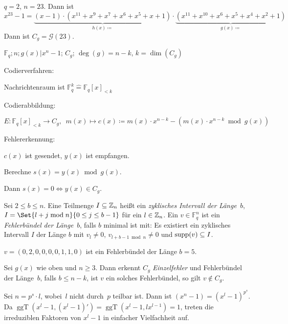 \documentclass{cheat-sheet}
\newcommand{\F}{\mathbb{F}} %
\newcommand{\divides}{|} %
\newcommand{\Golay}{\mathcal{G}} %
\DeclareMathOperator{\ggT}{ggT} %
\begin{document}
\begin{bsp}
  $q = 2$, $n = 23$.
  Dann ist
  \[
    x^{23} - 1 = \underbrace{(x-1) \cdot (x^{11} + x^9 + x^7 + x^6 + x^5 + x + 1)}_{h(x) \coloneqq} \cdot \underbrace{(x^{11} + x^{10} + x^6 + x^5 + x^4 + x^2 + 1)}_{g(x) \coloneqq}
  \]
  Dann ist $C_g = \Golay(23)$.
\end{bsp}


$\F_q; n; g(x) \divides x^n - 1$; $C_g$; $\deg(g) = n - k$, $k = \dim(C_g)$

Codierverfahren:

Nachrichtenraum ist $\F_q^k \hat{=} \F_q[x]_{< k}$

Codierabbildung:

\[
  E : \F_q[x]_{< k} \to C_g, \enspace m(x) \mapsto c(x) \coloneqq m(x) \cdot x^{n-k} - (m(x) \cdot x^{n-k} \bmod g(x))
\]

Fehlererkennung:

$c(x)$ ist gesendet, $y(x)$ ist empfangen.

Berechne $s(x) = y(x) \bmod g(x)$.

Dann $s(x) = 0 \iff y(x) \in C_g$.

\begin{defn}
  Sei $2 \leq b \leq n$.
  Eine Teilmenge $I \subseteq \mathbb{Z}_n$ heißt ein \emph{zyklisches Intervall der Länge~$b$}, \dh{} $I= \Set{l + j \bmod n}{0 \leq j \leq b-1}$ für ein $l \in \mathbb{Z}_n$.
  Ein $v \in \F_q^n$ ist ein \emph{Fehlerbündel der Länge~$b$}, falls $b$ minimal ist mit:
  Es existiert ein zyklisches Intervall $I$ der Länge $b$ mit $v_l \neq 0$, $v_{l+b-1 \bmod n} \neq 0$ und $\operatorname{supp}(v) \subseteq I$.
\end{defn}

\begin{bsp}
  $v = (0,2,0,0,0,0,1,1,0)$ ist ein Fehlerbündel der Länge $b = 5$.
\end{bsp}

\begin{prop}
  Sei $g(x)$ wie oben und $n \geq 3$.
  Dann erkennt $C_g$ \emph{Einzelfehler} und Fehlerbündel der Länge~$b$, falls $b \leq n - k$, \dh{} ist $v$ ein solches Fehlerbündel, so gilt $v \not\in C_g$.
\end{prop}



\begin{bem}
  Sei $n = p^s \cdot l$, wobei~$l$ nicht durch~$p$ teilbar ist.
  Dann ist $(x^n - 1) = (x^l - 1)^{p^s}$.
  Da $\ggT(x^l - 1, (x^l - 1)') = \ggT(x^l - 1, l x^{l-1}) = 1$, treten die irreduziblen Faktoren von $x^l - 1$ in einfacher Vielfachheit auf.
\end{bem}
\end{document}
